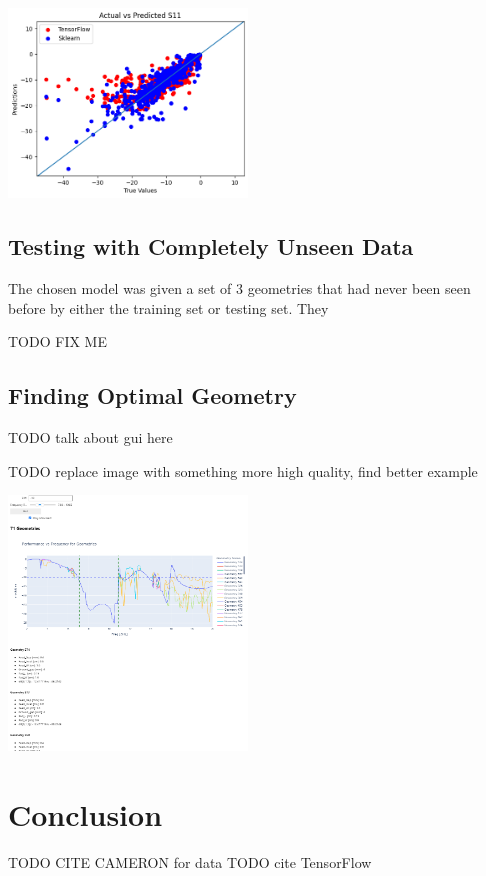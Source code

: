 \documentclass[lettersize,journal]{IEEEtran}
\newenvironment{Figure}
    {\par\medskip\noindent\minipage{\linewidth}}
    {\endminipage\par\medskip}
\begin{document}
\begin{Figure}
    \centering
    \includegraphics[width=2.5in]{actual_vs_predicted_s11}
    \label{actual_vs_predicted_s11}
\end{Figure}

\subsection{Testing with Completely Unseen Data}
The chosen model was given a set of 3 geometries that had never been seen before by either the training set or testing set. They 

TODO FIX ME 

\subsection{Finding Optimal Geometry}
TODO talk about gui here 

TODO replace image with something more high quality, find better example 

\begin{Figure}
    \centering
    \includegraphics[width=2.5in]{gui}
    \label{gui}
\end{Figure}


\section{Conclusion}

TODO CITE CAMERON for data
TODO cite TensorFlow





\vfill
\end{document}
